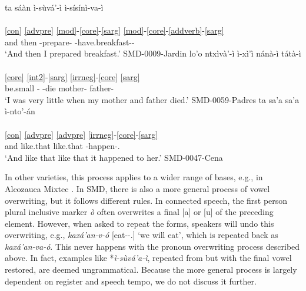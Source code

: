 \documentclass[output=paper]{langscibook}
\begin{document}
\ea
	\ea \label{ex:overwritingclause}
	\gllll ta sáàn ì-sùvá'-ì ì-sísínì-va-ì	\\
	    [ta³ sãː⁵¹ i¹-su¹βa⁵ʔ-i¹ i¹-si⁵si⁵ni¹-βa³-i¹] \\
	    \ref{con} \ref{advpre} \ref{mod}-\ref{core}-\ref{sarg} \ref{mod}-\ref{core}-\ref{addverb}-\ref{sarg} \\
			and then \Cmpl-prepare-\Fsg{} \Cmpl-have.breakfast-\Add{}-\Fsg{}		\\
	\glt `And then I prepared breakfast.' \hfill SMD-0009-Jardin
	\ex \label{ex:overwritingadv}
    \gllll lo'o ntxìvà'-ì ì-xì'ì nánà-ì tátà-ì	\\
            [lo³ʔo³ ⁿʥi¹βa¹ʔ-i¹ i¹-ɕi¹ʔi¹ na⁵na¹-i¹ ta⁵ta¹-i¹] \\
		   \ref{core} \ref{int2}-\ref{sarg} \ref{irrneg}-\ref{core} \ref{sarg} {} \\
			be.small \Intens-\Fsg{} \Cmpl-die mother-\Fsg{} father-\Fsg{}		\\
	\glt `I was very little when my mother and father died.' \hfill SMD-0059-Padres
	\ex \label{ex:overwritingneg}
	\gllll ta sa'a sa'a ì-nto'-án \\
	        [ta³ sa³ʔa³ sa³ʔa³ i¹-ⁿdo³ʔ-ã⁵] \\
			\ref{con} \ref{advpre} \ref{advpre} \ref{irrneg}-\ref{core}-\ref{sarg} \\
			and like.that like.that \Cmpl-happen-\Tsg.\F{}	\\
	\glt `And like that like that it happened to her.' \hfill SMD-0047-Cena
	\z
\z

In other varieties, this process applies to a wider range of bases, e.g., in Alcozauca Mixtec \citep{uchihara2021minimality}.
In SMD, there is also a more general process of vowel overwriting, but it follows different rules. In connected speech, the first person plural inclusive marker \emph{ò} often overwrites a final [a] or [u] of the preceding element. However, when asked to repeat the forms, speakers will undo this overwriting, e.g., \textit{kaxá'an-v-ó} [eat-\Add-\Fpl.\Incl{}] `we will eat', which is repeated back as \textit{kaxá'an-va-ó}.
This never happens with the pronoun overwriting process described above. In fact, examples like *\textit{ì-sùvá'a-ì}, repeated from  but with the final vowel restored, are deemed ungrammatical.
Because the more general process is largely dependent on register and speech tempo, we do not discuss it further.


\end{document}
